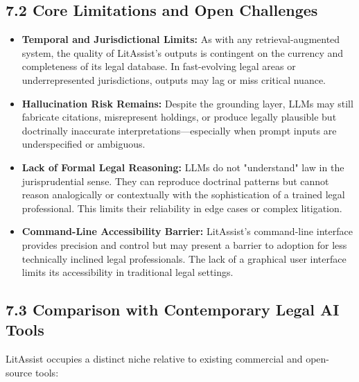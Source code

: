 \documentclass[12pt,a4paper]{article}
\begin{document}
\subsection*{7.2 Core Limitations and Open Challenges}

\begin{itemize}
\item \textbf{Temporal and Jurisdictional Limits:} As with any retrieval-augmented system, the quality of LitAssist's outputs is contingent on the currency and completeness of its legal database. In fast-evolving legal areas or underrepresented jurisdictions, outputs may lag or miss critical nuance.

\item \textbf{Hallucination Risk Remains:} Despite the grounding layer, LLMs may still fabricate citations, misrepresent holdings, or produce legally plausible but doctrinally inaccurate interpretations—especially when prompt inputs are underspecified or ambiguous.

\item \textbf{Lack of Formal Legal Reasoning:} LLMs do not "understand" law in the jurisprudential sense. They can reproduce doctrinal patterns but cannot reason analogically or contextually with the sophistication of a trained legal professional. This limits their reliability in edge cases or complex litigation.

\item \textbf{Command-Line Accessibility Barrier:} LitAssist's command-line interface provides precision and control but may present a barrier to adoption for less technically inclined legal professionals. The lack of a graphical user interface limits its accessibility in traditional legal settings.
\end{itemize}

\subsection*{7.3 Comparison with Contemporary Legal AI Tools}

LitAssist occupies a distinct niche relative to existing commercial and open-source tools:
\end{document}
